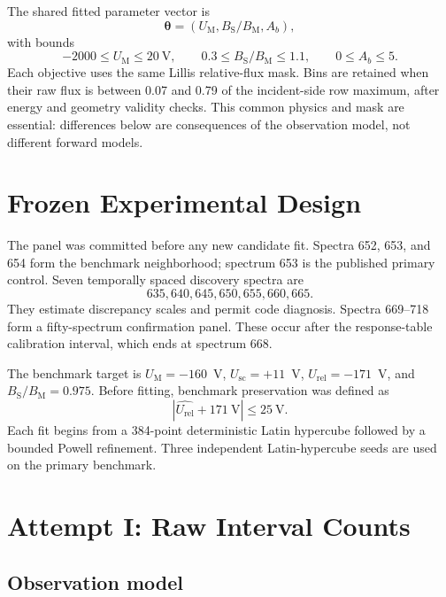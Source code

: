 \documentclass[11pt]{article}
\newcommand{\UM}{U_{\mathrm{M}}}
\newcommand{\Usc}{U_{\mathrm{sc}}}
\newcommand{\Urel}{U_{\mathrm{rel}}}
\newcommand{\BSBM}{B_{\mathrm{S}}/B_{\mathrm{M}}}
\begin{document}
The shared fitted parameter vector is
\begin{equation}
  \boldsymbol\theta=(\UM,\BSBM,A_b),
\end{equation}
with bounds
\begin{equation}
  -2000 \le \UM \le 20~\mathrm{V},\qquad
  0.3 \le \BSBM \le 1.1,\qquad
  0 \le A_b \le 5.
\end{equation}
Each objective uses the same Lillis relative-flux mask.  Bins are retained when
their raw flux is between 0.07 and 0.79 of the incident-side row maximum, after
energy and geometry validity checks.  This common physics and mask are
essential: differences below are consequences of the observation model, not
different forward models.

\section{Frozen Experimental Design}

The panel was committed before any new candidate fit.  Spectra 652, 653, and
654 form the benchmark neighborhood; spectrum 653 is the published primary
control.  Seven temporally spaced discovery spectra are
\begin{equation*}
  635,640,645,650,655,660,665.
\end{equation*}
They estimate discrepancy scales and permit code diagnosis.  Spectra 669--718
form a fifty-spectrum confirmation panel.  These occur after the response-table
calibration interval, which ends at spectrum 668.

The benchmark target is $\UM=-160$~V, $\Usc=+11$~V,
$\Urel=-171$~V, and $\BSBM=0.975$.  Before fitting, benchmark preservation was
defined as
\begin{equation}
  |\widehat{\Urel}+171~\mathrm{V}|\le 25~\mathrm{V}.
\end{equation}
Each fit begins from a 384-point deterministic Latin hypercube followed by a
bounded Powell refinement.  Three independent Latin-hypercube seeds are used
on the primary benchmark.

\section{Attempt I: Raw Interval Counts}

\subsection{Observation model}
\end{document}
